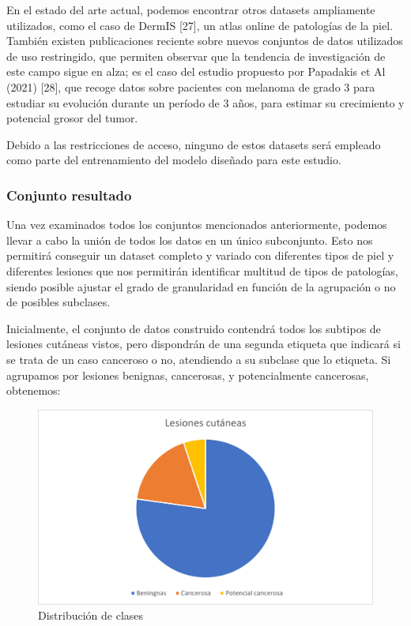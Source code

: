 En el estado del arte actual, podemos encontrar otros datasets ampliamente utilizados, como el caso de DermIS [27], un atlas online de patologías de la piel. También existen publicaciones reciente sobre nuevos conjuntos de datos utilizados de uso restringido, que permiten observar que la tendencia de investigación de este campo sigue en alza; es el caso del estudio propuesto por Papadakis et Al (2021) [28], que recoge datos sobre pacientes con melanoma de grado 3 para estudiar su evolución durante un período de 3 años, para estimar su crecimiento y potencial grosor del tumor.

Debido a las restricciones de acceso, ninguno de estos datasets será empleado como parte del entrenamiento del modelo diseñado para este estudio.

\subsubsection{Conjunto resultado}
Una vez examinados todos los conjuntos mencionados anteriormente, podemos llevar a cabo la unión de todos los datos en un único subconjunto. Esto nos permitirá conseguir un dataset completo y variado con diferentes tipos de piel y diferentes lesiones que nos permitirán identificar multitud de tipos de patologías, siendo posible ajustar el grado de granularidad en función de la agrupación o no de posibles subclases.

Inicialmente, el conjunto de datos construido contendrá todos los subtipos de lesiones cutáneas vistos, pero dispondrán de una segunda etiqueta que indicará si se trata de un caso canceroso o no, atendiendo a su subclase que lo etiqueta. Si agrupamos por lesiones benignas, cancerosas, y potencialmente cancerosas, obtenemos:


\begin{figure}[H]
	\centering
	\includegraphics[scale = 0.65]{imagenes/datasetfinal.png}
	\caption{Distribución de clases}
\end{figure}

